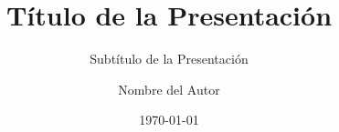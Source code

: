 \documentclass[
	9pt,
    aspectratio=169,
    professionalfonts,
	 handout %
]{beamer}
\title{Título de la Presentación}
\subtitle{Subtítulo de la Presentación}
\author{Nombre del Autor}
\institute{Universidad Técnica Federico Santa María}
\date{\today}
\numberwithin{equation}{section}
\begin{document}
\frame{\titlepage}


\end{document}

